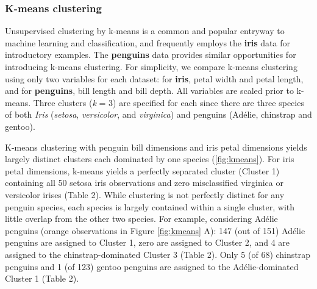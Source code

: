 \hypertarget{k-means-clustering}{%
\subsubsection{K-means clustering}\label{k-means-clustering}}

Unsupervised clustering by k-means is a common and popular entryway to machine learning and classification, and frequently employs the \textbf{iris} data for introductory examples. The \textbf{penguins} data provides similar opportunities for introducing k-means clustering. For simplicity, we compare k-means clustering using only two variables for each dataset: for \textbf{iris}, petal width and petal length, and for \textbf{penguins}, bill length and bill depth. All variables are scaled prior to k-means. Three clusters (\emph{k} = 3) are specified for each since there are three species of both \emph{Iris} (\emph{setosa}, \emph{versicolor}, and \emph{virginica}) and penguins (Adélie, chinstrap and gentoo).

K-means clustering with penguin bill dimensions and iris petal dimensions yields largely distinct clusters each dominated by one species (\ref{fig:kmeans}). For iris petal dimensions, k-means yields a perfectly separated cluster (Cluster 1) containing all 50 setosa iris observations and zero misclassified virginica or versicolor irises (Table 2). While clustering is not perfectly distinct for any penguin species, each species is largely contained within a single cluster, with little overlap from the other two species. For example, considering Adélie penguins (orange observations in Figure \ref{fig:kmeans} A): 147 (out of 151) Adélie penguins are assigned to Cluster 1, zero are assigned to Cluster 2, and 4 are assigned to the chinstrap-dominated Cluster 3 (Table 2). Only 5 (of 68) chinstrap penguins and 1 (of 123) gentoo penguins are assigned to the Adélie-dominated Cluster 1 (Table 2).

